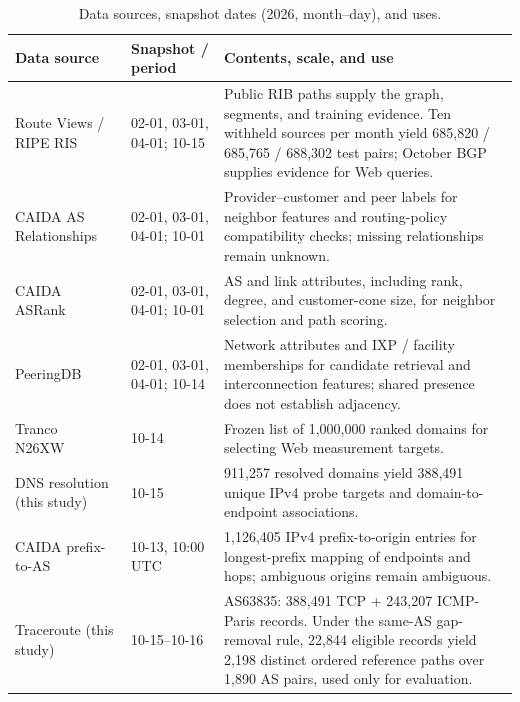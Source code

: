 \begin{table}[t]
\centering
\caption{Data sources, snapshot dates (2026, month--day), and uses.}
\label{tab:data_sources}
\footnotesize
\setlength{\tabcolsep}{4pt}
\renewcommand{\arraystretch}{1.0}
\begin{tabularx}{\textwidth}{@{}p{3.0cm}p{2.65cm}X@{}}
\toprule
Data source & Snapshot / period & Contents, scale, and use\\
\midrule
Route Views / RIPE RIS~\cite{RouteViews,RIPERIS}
& 02-01, 03-01, 04-01; 10-15
& Public RIB paths supply the graph, segments, and training evidence.
Ten withheld sources per month yield 685,820 / 685,765 / 688,302 test pairs;
October BGP supplies evidence for Web queries.\\
CAIDA AS Relationships~\cite{caidaASRelationships}
& 02-01, 03-01, 04-01; 10-01
& Provider--customer and peer labels for neighbor features and
routing-policy compatibility checks; missing relationships remain unknown.\\
CAIDA ASRank~\cite{caidaASrank}
& 02-01, 03-01, 04-01; 10-01
& AS and link attributes, including rank, degree, and customer-cone size,
for neighbor selection and path scoring.\\
PeeringDB~\cite{PeeringDB}
& 02-01, 03-01, 04-01; 10-14
& Network attributes and IXP / facility memberships for candidate retrieval
and interconnection features; shared presence does not establish adjacency.\\
\addlinespace
Tranco N26XW~\cite{lepochat2019tranco}
& 10-14
& Frozen list of 1,000,000 ranked domains for selecting Web measurement targets.\\
DNS resolution (this study)
& 10-15
& 911,257 resolved domains yield 388,491 unique IPv4 probe targets and
domain-to-endpoint associations.\\
CAIDA prefix-to-AS~\cite{caidaRouteviewsPfx2AS}
& 10-13, 10:00 UTC
& 1,126,405 IPv4 prefix-to-origin entries for longest-prefix mapping of
endpoints and hops; ambiguous origins remain ambiguous.\\
\addlinespace
Traceroute (this study)
& 10-15--10-16
& AS63835: 388,491 TCP + 243,207 ICMP-Paris records. Under the same-AS
gap-removal rule, 22,844 eligible records yield 2,198 distinct ordered
reference paths over 1,890 AS pairs, used only for evaluation.\\
\bottomrule
\end{tabularx}
\end{table}
